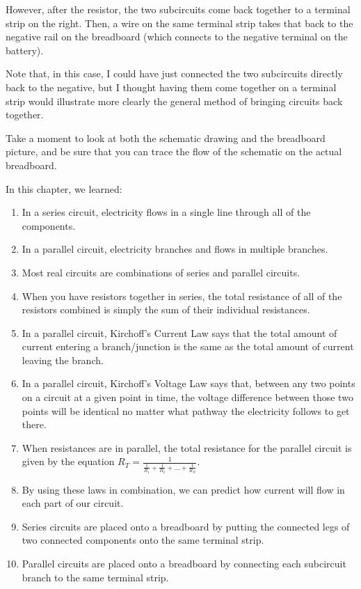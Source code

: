 However, after the resistor, the two subcircuits come back together to a terminal strip on the right.
Then, a wire on the same terminal strip takes that back to the negative rail on the breadboard (which connects to the negative terminal on the battery).

Note that, in this case, I could have just connected the two subcircuits directly back to the negative, but I thought having them come together on a terminal strip would illustrate more clearly the general method of bringing circuits back together.

Take a moment to look at both the schematic drawing and the breadboard picture, and be sure that you can trace the flow of the schematic on the actual breadboard.

\reviewsection

In this chapter, we learned:
\begin{enumerate}
\item In a series circuit, electricity flows in a single line through all of the components.
\item In a parallel circuit, electricity branches and flows in multiple branches.
\item Most real circuits are combinations of series and parallel circuits.
\item When you have resistors together in series, the total resistance of all of the resistors combined is simply the sum of their individual resistances.
\item In a parallel circuit, Kirchoff's Current Law says that the total amount of current entering a branch/junction is the same as the total amount of current leaving the branch.
\item In a parallel circuit, Kirchoff's Voltage Law says that, between any two points on a circuit at a given point in time, the voltage difference between those two points will be identical no matter what pathway the electricity follows to get there.
\item When resistances are in parallel, the total resistance for the parallel circuit is given by the equation $R_T = \frac{1}{\frac{1}{R_1} + \frac{1}{R_2} + \ldots + \frac{1}{R_N}}$.
\item By using these laws in combination, we can predict how current will flow in each part of our circuit.
\item Series circuits are placed onto a breadboard by putting the connected legs of two connected components onto the same terminal strip.
\item Parallel circuits are placed onto a breadboard by connecting each subcircuit branch to the same terminal strip.
\end{enumerate}

